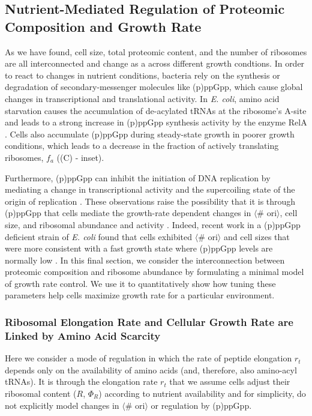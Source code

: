 \subsection{Nutrient-Mediated Regulation of Proteomic Composition and Growth Rate}
As we have found, cell size, total proteomic content, and the number of ribosomes
are all interconnected and change as a across different growth condtions. In order to
react to changes in nutrient conditions, bacteria rely on the synthesis or
degradation of secondary-messenger molecules  like (p)ppGpp, which cause global
changes in transcriptional and translational activity. In \textit{E. coli},
amino acid starvation causes the accumulation of de-acylated tRNAs at the
ribosome's A-site and leads to a strong increase in (p)ppGpp synthesis activity
by the enzyme RelA \citep{hauryliuk2015}. Cells also accumulate (p)ppGpp  during
steady-state growth in poorer growth conditions, which leads to a decrease in
the fraction of actively translating ribosomes, $f_a$  ((C) - inset).

Furthermore, (p)ppGpp can inhibit the initiation of DNA replication by mediating
a change in transcriptional activity and the supercoiling state of the origin of
replication \citep{kraemer2019}. These observations raise the possibility that
it is through (p)ppGpp that cells mediate the growth-rate dependent changes in
$\langle$\# ori$\rangle$, cell size, and ribosomal abundance and activity
\citep{zhu2019, Buke2020}. Indeed, recent work in a (p)ppGpp deficient strain of
\textit{E. coli} found that cells exhibited $\langle$\# ori$\rangle$ and cell
sizes that were more consistent with a fast growth state where (p)ppGpp levels
are normally low \citep{fernandezcoll2020}. In this final section, we consider
the interconnection between proteomic composition and ribosome abundance by
formulating a minimal model of growth rate control. We use it to quantitatively
show how tuning these parameters help cells maximize growth rate for a
particular environment.



\subsubsection{Ribosomal Elongation Rate and Cellular Growth Rate are Linked by
Amino Acid Scarcity}
Here we consider a mode of regulation in which the rate of peptide elongation
$r_t$ depends only on the availability of amino acids (and, therefore, also
amino-acyl tRNAs). It is through the elongation rate $r_t$ that we assume cells
adjust their ribosomal content ($R$, $\Phi_R$) according to nutrient
availability and for simplicity, do not explicitly model changes in  $\langle$\#
ori$\rangle$ or regulation by (p)ppGpp.

